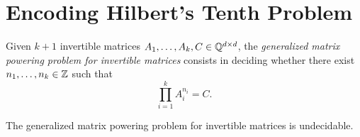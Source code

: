 \section{Encoding Hilbert's Tenth Problem}
\label{sec:matrix-undecidability}

Given $k+1$ invertible matrices $A_{1}, \ldots, A_{k},C \in \mathbb{Q}^{d \times d}$, the \emph{generalized matrix powering problem for invertible matrices} consists in deciding whether there exist $n_{1}, \ldots, n_{k} \in \mathbb{Z}$ such that
\begin{equation*}
\prod\limits_{i=1}^{k} A_{i}^{n_{i}} = C.
\end{equation*}

\begin{theorem}
The generalized matrix powering problem for invertible matrices is undecidable.
\end{theorem}

